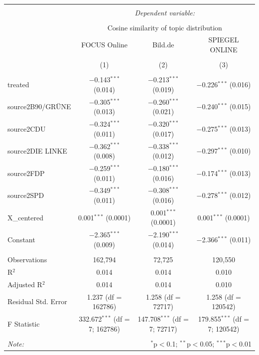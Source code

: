 \documentclass[
]{article}
\begin{document}
\begin{table}[!htbp] \centering 
  \caption{} 
  \label{} 
\tiny 
\begin{tabular}{@{\extracolsep{5pt}}lccc} 
\\[-1.8ex]\hline 
\hline \\[-1.8ex] 
 & \multicolumn{3}{c}{\textit{Dependent variable:}} \\ 
\cline{2-4} 
\\[-1.8ex] & \multicolumn{3}{c}{Cosine similarity of topic distribution} \\ 
 & FOCUS Online & Bild.de & SPIEGEL ONLINE \\ 
\\[-1.8ex] & (1) & (2) & (3)\\ 
\hline \\[-1.8ex] 
 treated & $-$0.143$^{***}$ (0.014) & $-$0.213$^{***}$ (0.019) & $-$0.226$^{***}$ (0.016) \\ 
  source2B90/GRÜNE & $-$0.305$^{***}$ (0.013) & $-$0.260$^{***}$ (0.021) & $-$0.240$^{***}$ (0.015) \\ 
  source2CDU & $-$0.324$^{***}$ (0.011) & $-$0.320$^{***}$ (0.017) & $-$0.275$^{***}$ (0.013) \\ 
  source2DIE LINKE & $-$0.362$^{***}$ (0.008) & $-$0.338$^{***}$ (0.012) & $-$0.297$^{***}$ (0.010) \\ 
  source2FDP & $-$0.259$^{***}$ (0.011) & $-$0.180$^{***}$ (0.016) & $-$0.174$^{***}$ (0.013) \\ 
  source2SPD & $-$0.349$^{***}$ (0.011) & $-$0.308$^{***}$ (0.016) & $-$0.278$^{***}$ (0.012) \\ 
  X\_centered & 0.001$^{***}$ (0.0001) & 0.001$^{***}$ (0.0001) & 0.001$^{***}$ (0.0001) \\ 
  Constant & $-$2.365$^{***}$ (0.009) & $-$2.190$^{***}$ (0.014) & $-$2.366$^{***}$ (0.011) \\ 
 \hline \\[-1.8ex] 
Observations & 162,794 & 72,725 & 120,550 \\ 
R$^{2}$ & 0.014 & 0.014 & 0.010 \\ 
Adjusted R$^{2}$ & 0.014 & 0.014 & 0.010 \\ 
Residual Std. Error & 1.237 (df = 162786) & 1.258 (df = 72717) & 1.258 (df = 120542) \\ 
F Statistic & 332.672$^{***}$ (df = 7; 162786) & 147.708$^{***}$ (df = 7; 72717) & 179.855$^{***}$ (df = 7; 120542) \\ 
\hline 
\hline \\[-1.8ex] 
\textit{Note:}  & \multicolumn{3}{r}{$^{*}$p$<$0.1; $^{**}$p$<$0.05; $^{***}$p$<$0.01} \\ 
\end{tabular} 
\end{table}
\end{document}

